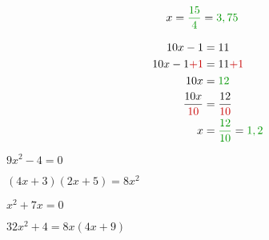 \begin{pagesolutions}
\begin{tcolorbox}[cartesolution={11}]
\begin{align*}
            x &= \reduc{\frac{15}{4}} = \reduc{3,75}
        \end{align*}
    \end{tcolorbox}
    \begin{tcolorbox}[cartesolution={12}]
        \begin{align*}
            10x - 1 &= 11 \\
            10x - 1 \modif{+ 1} &= 11 \modif{+ 1} \\
            10x &= \reduc{12} \\
            \frac{10x}{\modif{10}} &= \frac{12}{\modif{10}} \\
            x &= \reduc{\frac{12}{10}} = \reduc{1,2}
        \end{align*}
    \end{tcolorbox}
\end{pagesolutions}
\begin{pageenonces}
    \begin{tcolorbox}[carteenonce={13}]
        $9x^2 - 4 = 0$
    \end{tcolorbox}
    \begin{tcolorbox}[carteenonce={14}]
        $(4x + 3)(2x + 5) = 8x^2$
    \end{tcolorbox}
    \begin{tcolorbox}[carteenonce={15}]
        $x^2 + 7x = 0$
    \end{tcolorbox}
    \begin{tcolorbox}[carteenonce={16}]
        $32x^2 + 4 = 8x(4x + 9)$
    \end{tcolorbox}
\end{pageenonces}

